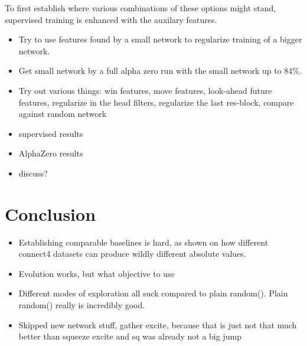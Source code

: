 \documentclass[12pt,onecolumn,oneside,titlepage]{article}
\begin{document}
To first establish where various combinations of these options might stand, supervised training is enhanced with the auxilary features.


\begin{itemize}
 \item Try to use features found by a small network to regularize training of a bigger network.
 \item Get small network by a full alpha zero run with the small network up to 84\%.
 \item Try out various things: win features, move features, look-ahead future features, regularize in the head filters, regularize the last res-block, compare against random network
 \item supervised results
 \item AlphaZero results
 \item discuss?
\end{itemize}



\section{Conclusion}

\begin{itemize}
 \item Establishing comparable baselines is hard, as shown on how different connect4 datasets can produce wildly different absolute values.
 \item Evolution works, but what objective to use
 \item Different modes of exploration all suck compared to plain random(). Plain random() really is incredibly good.
 \item Skipped new network stuff, gather excite, because that is just not that much better than squeeze excite and sq was already not a big jump
\end{itemize}



\pagebreak




\end{document}
